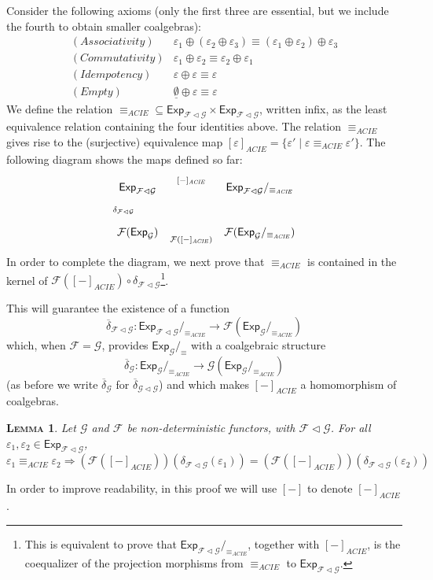 \documentclass{LMCS}
\newcommand\E\varepsilon
\newcommand\Exp{\mathsf{Exp}}
\newcommand\G{\mathcal{G}}
\newcommand\F{\mathcal{F}}
\newcommand\emp{\underline\emptyset}
\def\hyph{-\penalty0\hskip0pt\relax}
\theoremstyle{definition}
\theoremstyle{plain}
\newtheorem{mylemma}[mydefinition]{\textsc{Lemma}}
\theoremstyle{plain}
\theoremstyle{plain}
\theoremstyle{plain}
\theoremstyle{definition}
\theoremstyle{definition}
\newenvironment{lemma}{
\begin{mylemma}}
    {\end{mylemma}}
\begin{document}
Consider the following axioms (only the first three are essential, but we include
the fourth to obtain smaller coalgebras):
\[
\begin{array}{llll}
\mathit{(Associativity)} &  \E_1 \oplus (\E_2 \oplus \E_3)  \equiv
(\E_1 \oplus
\E_2) \oplus \E_3\\
\mathit{(Commutativity)} &  \E_1 \oplus \E_2  \equiv \E_2 \oplus
\E_1\\
\mathit{(Idempotency)}   &  \E \oplus \E  \equiv \E\\
\mathit{(Empty)}        &   \emp \oplus \E \equiv \E
\end{array}
\]
We define the relation $\equiv_{\mathit{ACIE}} \subseteq \Exp_{\F\lhd
\G}\times \Exp_{\F\lhd \G}$, written infix, as the least equivalence
relation containing the four identities above. The relation
$\equiv_{\mathit{ACIE}}$ gives rise to the (surjective) equivalence
map $[\E]_{\mathit{ACIE}} = \{\E'\mid \E\equiv_{\mathit{ACIE}}
\E'\}$. The following diagram shows the maps defined so far:
\[
\xymatrix{
\Exp_{\F\lhd \G}\ar[d]_{\delta_{\F\lhd \G}} \ar[rr]^-{[-]_{\mathit{ACIE}}}
&&
\Exp_{\F\lhd \G}/_{\equiv_{\mathit{ACIE}}}\\
\F(\Exp_{\G})\ar[rr]_-{\F([-]_{\mathit{ACIE}})} && \F (\Exp_\G/_{\equiv_{\mathit{ACIE}}}) 
}
\]
In order to complete the diagram, we next prove that $\equiv_{\mathit{ACIE}}$ is contained in the kernel
of $\F ([-]_{\mathit{ACIE}}) \circ \delta_{\F\lhd \G}$\footnote{This is
equivalent to prove that $\Exp_{\F\lhd \G}/_{\equiv_{\mathit{ACIE}}}$, together with
$[-]_{\mathit{ACIE}}$, is the coequalizer of the projection morphisms from $\equiv_{\mathit{ACIE}}$ to
$\Exp_{\F\lhd \G}$.}. 

This will
guarantee the existence of a function $$\overline{\delta}_{\F\lhd
\G}\colon
\Exp_{\F\lhd \G}/_{\equiv_{\mathit{ACIE}}} \to
\F(\Exp_\G/_{\equiv_{\mathit{ACIE}}})$$ which, when $\F=\G$, provides
$\Exp_\G/_\equiv$ with a coalgebraic structure $$\overline{\delta}_\G\colon
\Exp_\G/_{\equiv_{\mathit{ACIE}}} \to
\G(\Exp_\G/_{\equiv_{\mathit{ACIE}}})$$ (as before we write
$\overline{\delta}_\G$ for $\overline{\delta}_{\G\lhd \G}$) and which
makes $[-]_{\mathit{ACIE}}$ a homomorphism of coalgebras. 
\begin{lemma}\label{lemma:equivACIE}
Let $\G$ and $\F$ be non\hyph deterministic functors, with $\F\lhd \G$. For all $\E_1,\E_2\in \Exp_{\F\lhd \G}$,
\[
\E_1\equiv_{\mathit{ACIE}} \E_2 \Rightarrow (\F ([-]_{\mathit{ACIE}})) (\delta_{\F\lhd
\G}(\E_1)) = (\F ([-]_{\mathit{ACIE}})) (\delta_{\F\lhd
\G}(\E_2))
\]
\end{lemma}
\proof 
In order to improve readability, in this proof we will use $[-]$
to denote $[-]_{\mathit{ACIE}}$.  
\end{document}
